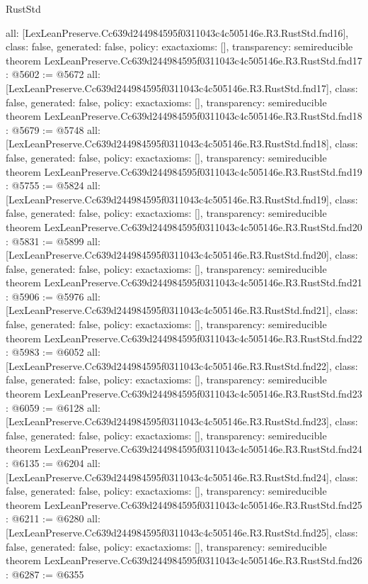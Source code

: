 \begin{lexlean}{RustStd}
\begin{coremodule}
{  all: [LexLeanPreserve.Cc639d244984595f0311043c4c505146e.R3.RustStd.fnd16],
  class: false,
  generated: false,
  policy: exact{axioms: []},
  transparency: semireducible
}
theorem LexLeanPreserve.Cc639d244984595f0311043c4c505146e.R3.RustStd.fnd17 : @5602 := @5672 {
  all: [LexLeanPreserve.Cc639d244984595f0311043c4c505146e.R3.RustStd.fnd17],
  class: false,
  generated: false,
  policy: exact{axioms: []},
  transparency: semireducible
}
theorem LexLeanPreserve.Cc639d244984595f0311043c4c505146e.R3.RustStd.fnd18 : @5679 := @5748 {
  all: [LexLeanPreserve.Cc639d244984595f0311043c4c505146e.R3.RustStd.fnd18],
  class: false,
  generated: false,
  policy: exact{axioms: []},
  transparency: semireducible
}
theorem LexLeanPreserve.Cc639d244984595f0311043c4c505146e.R3.RustStd.fnd19 : @5755 := @5824 {
  all: [LexLeanPreserve.Cc639d244984595f0311043c4c505146e.R3.RustStd.fnd19],
  class: false,
  generated: false,
  policy: exact{axioms: []},
  transparency: semireducible
}
theorem LexLeanPreserve.Cc639d244984595f0311043c4c505146e.R3.RustStd.fnd20 : @5831 := @5899 {
  all: [LexLeanPreserve.Cc639d244984595f0311043c4c505146e.R3.RustStd.fnd20],
  class: false,
  generated: false,
  policy: exact{axioms: []},
  transparency: semireducible
}
theorem LexLeanPreserve.Cc639d244984595f0311043c4c505146e.R3.RustStd.fnd21 : @5906 := @5976 {
  all: [LexLeanPreserve.Cc639d244984595f0311043c4c505146e.R3.RustStd.fnd21],
  class: false,
  generated: false,
  policy: exact{axioms: []},
  transparency: semireducible
}
theorem LexLeanPreserve.Cc639d244984595f0311043c4c505146e.R3.RustStd.fnd22 : @5983 := @6052 {
  all: [LexLeanPreserve.Cc639d244984595f0311043c4c505146e.R3.RustStd.fnd22],
  class: false,
  generated: false,
  policy: exact{axioms: []},
  transparency: semireducible
}
theorem LexLeanPreserve.Cc639d244984595f0311043c4c505146e.R3.RustStd.fnd23 : @6059 := @6128 {
  all: [LexLeanPreserve.Cc639d244984595f0311043c4c505146e.R3.RustStd.fnd23],
  class: false,
  generated: false,
  policy: exact{axioms: []},
  transparency: semireducible
}
theorem LexLeanPreserve.Cc639d244984595f0311043c4c505146e.R3.RustStd.fnd24 : @6135 := @6204 {
  all: [LexLeanPreserve.Cc639d244984595f0311043c4c505146e.R3.RustStd.fnd24],
  class: false,
  generated: false,
  policy: exact{axioms: []},
  transparency: semireducible
}
theorem LexLeanPreserve.Cc639d244984595f0311043c4c505146e.R3.RustStd.fnd25 : @6211 := @6280 {
  all: [LexLeanPreserve.Cc639d244984595f0311043c4c505146e.R3.RustStd.fnd25],
  class: false,
  generated: false,
  policy: exact{axioms: []},
  transparency: semireducible
}
theorem LexLeanPreserve.Cc639d244984595f0311043c4c505146e.R3.RustStd.fnd26 : @6287 := @6355 {
}
\end{coremodule}
\end{lexlean}
